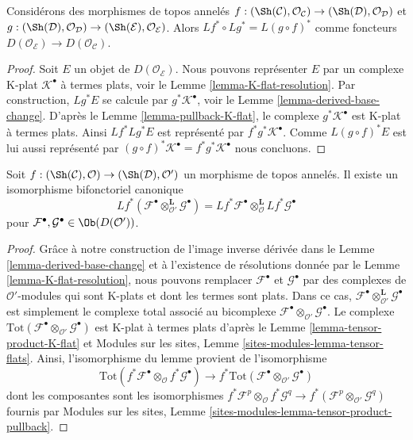 \begin{lemma}
\label{lemma-derived-pullback-composition}
Considérons des morphismes de topos annelés
$f : (\Sh(\mathcal{C}), \mathcal{O}_\mathcal{C}) \to
(\Sh(\mathcal{D}), \mathcal{O}_\mathcal{D})$
et
$g : (\Sh(\mathcal{D}), \mathcal{O}_\mathcal{D}) \to
(\Sh(\mathcal{E}), \mathcal{O}_\mathcal{E})$.
Alors $Lf^* \circ Lg^* = L(g \circ f)^*$ comme foncteurs
$D(\mathcal{O}_\mathcal{E}) \to D(\mathcal{O}_\mathcal{C})$.
\end{lemma}

\begin{proof}
Soit $E$ un objet de $D(\mathcal{O}_\mathcal{E})$. Nous pouvons représenter
$E$ par un complexe K-plat $\mathcal{K}^\bullet$ à termes plats, voir le
Lemme \ref{lemma-K-flat-resolution}. Par construction, $Lg^*E$ se calcule
par $g^*\mathcal{K}^\bullet$, voir le Lemme
\ref{lemma-derived-base-change}. D'après le Lemme
\ref{lemma-pullback-K-flat}, le complexe $g^*\mathcal{K}^\bullet$ est
K-plat à termes plats. Ainsi $Lf^*Lg^*E$ est représenté par
$f^*g^*\mathcal{K}^\bullet$. Comme $L(g \circ f)^*E$ est lui aussi
représenté par
$(g \circ f)^*\mathcal{K}^\bullet = f^*g^*\mathcal{K}^\bullet$
nous concluons.
\end{proof}

\begin{lemma}
\label{lemma-pullback-tensor-product}
Soit $f : (\Sh(\mathcal{C}), \mathcal{O}) \to (\Sh(\mathcal{D}), \mathcal{O}')$
un morphisme de topos annelés. Il existe un isomorphisme bifonctoriel
canonique
$$
Lf^*(
\mathcal{F}^\bullet \otimes_{\mathcal{O}'}^{\mathbf{L}} \mathcal{G}^\bullet
) =
Lf^*\mathcal{F}^\bullet 
\otimes_{\mathcal{O}}^{\mathbf{L}}
Lf^*\mathcal{G}^\bullet 
$$
pour $\mathcal{F}^\bullet, \mathcal{G}^\bullet \in \Ob(D(\mathcal{O}'))$.
\end{lemma}

\begin{proof}
Grâce à notre construction de l'image inverse dérivée dans le Lemme
\ref{lemma-derived-base-change} et à l'existence de résolutions donnée par
le Lemme \ref{lemma-K-flat-resolution}, nous pouvons remplacer
$\mathcal{F}^\bullet$ et $\mathcal{G}^\bullet$ par des complexes de
$\mathcal{O}'$-modules qui sont K-plats et dont les termes sont plats.
Dans ce cas,
$\mathcal{F}^\bullet \otimes_{\mathcal{O}'}^{\mathbf{L}} \mathcal{G}^\bullet$
est simplement le complexe total associé au bicomplexe
$\mathcal{F}^\bullet \otimes_{\mathcal{O}'} \mathcal{G}^\bullet$.
Le complexe
$\text{Tot}(\mathcal{F}^\bullet \otimes_{\mathcal{O}'} \mathcal{G}^\bullet)$
est K-plat à termes plats d'après le Lemme
\ref{lemma-tensor-product-K-flat} et Modules sur les sites, Lemme
\ref{sites-modules-lemma-tensor-flats}. Ainsi, l'isomorphisme du lemme
provient de l'isomorphisme
$$
\text{Tot}(f^*\mathcal{F}^\bullet \otimes_{\mathcal{O}}
f^*\mathcal{G}^\bullet)
\longrightarrow
f^*\text{Tot}(\mathcal{F}^\bullet \otimes_{\mathcal{O}'} \mathcal{G}^\bullet)
$$
dont les composantes sont les isomorphismes
$f^*\mathcal{F}^p \otimes_{\mathcal{O}} f^*\mathcal{G}^q \to
f^*(\mathcal{F}^p \otimes_{\mathcal{O}'} \mathcal{G}^q)$ fournis par
Modules sur les sites, Lemme
\ref{sites-modules-lemma-tensor-product-pullback}.
\end{proof}

